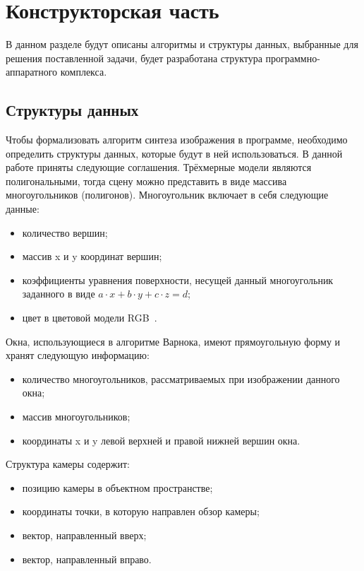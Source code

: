 \chapter{Конструкторская часть}

В данном разделе будут описаны алгоритмы и структуры данных, выбранные для
решения поставленной задачи, будет разработана структура программно-аппаратного комплекса. 

\section{Структуры данных}

Чтобы формализовать алгоритм синтеза изображения в программе, необходимо определить структуры данных, которые будут в ней использоваться. 
В данной работе приняты следующие соглашения. 
Трёхмерные модели являются полигональными, тогда сцену можно представить в виде массива многоугольников (полигонов). Многоугольник включает в себя следующие данные:

\begin{itemize}
    \item количество вершин;
    \item массив x и y координат вершин;
    \item коэффициенты уравнения поверхности, несущей данный многоугольник заданного в виде $a \cdot x + b \cdot y + c \cdot z = d$;
    \item цвет в цветовой модели RGB~\cite{rgb}.
\end{itemize}

Окна, использующиеся в алгоритме Варнока, имеют прямоугольную форму и хранят следующую информацию:
\begin{itemize}
    \item количество многоугольников, рассматриваемых при изображении данного окна;
    \item массив многоугольников;
    \item координаты x и y левой верхней и правой нижней вершин окна. 
\end{itemize}

Структура камеры содержит:
\begin{itemize}
    \item позицию камеры в объектном пространстве;
    \item координаты точки, в которую направлен обзор камеры;
    \item вектор, направленный вверх;
    \item вектор, направленный вправо.
\end{itemize}

